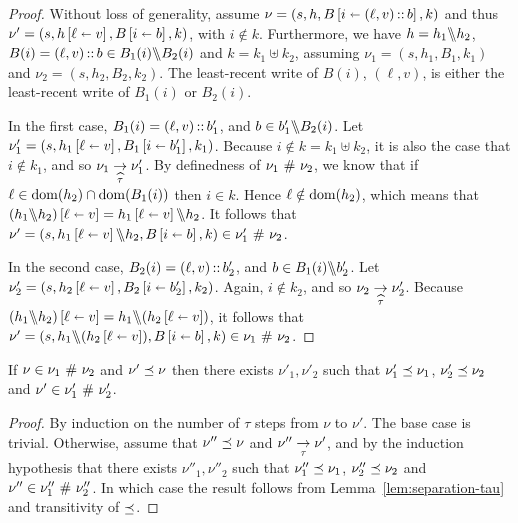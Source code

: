 \documentclass[11pt]{report}
\begin{document}
\begin{proof}
  Without loss of generality, assume $\nu = (s,h,B \left[ i \shortleftarrow (\ell,v)\operatorname{:\!:} b \right],k)$ and thus $\nu' = (s,h \left[ \ell \shortleftarrow v \right],B \left[ i \shortleftarrow b \right],k)$, with $i \notin k$. Furthermore, we have $h = h_1 \backslash\!\!\backslash h_2$, $B(i) = (\ell,v) \operatorname{:\!:} b \in B_1(i) \backslash\!\!\backslash B_2(i)$ and $k = k_1 \uplus k_2$, assuming $\nu_1 = (s,h_1,B_1,k_1)$ and $\nu_2 = (s,h_2,B_2,k_2)$. The least-recent write of $B(i)$, $(\ell,v)$, is either the least-recent write of $B_1(i)$ or $B_2(i)$. 

  In the first case, $B_1(i) = (\ell,v) \operatorname{:\!:} b_1'$, and $b \in b'_1 \backslash\!\!\backslash B_2(i)$. Let $\nu'_1 = (s,h_1 \left[ \ell \shortleftarrow v \right],B_1 \left[ i \shortleftarrow b'_1 \right],k_1)$. Because $i \notin k = k_1 \uplus k_2$, it is also the case that $i \notin k_1$, and so $\nu_1 \underset{\widehat{\tau}}{\rightarrow} \nu'_1$. By definedness of $\nu_1 \operatorname{\,\#\,} \nu_2$, we know that if $\ell \in \operatorname{\mathrm{dom}}(h_2) \cap \operatorname{\mathrm{dom}}(B_1(i))$ then $i \in k$. Hence $\ell \notin \operatorname{\mathrm{dom}}(h_2)$, which means that $(h_1 \backslash\!\!\backslash h_2) \left[ \ell \shortleftarrow v \right] = h_1 \left[ \ell \shortleftarrow v \right] \backslash\!\!\backslash h_2$. It follows that $\nu' = (s,h_1 \left[ \ell \shortleftarrow v \right] \backslash\!\!\backslash h_2, B \left[ i \shortleftarrow b \right],k) \in \nu'_1 \operatorname{\,\#\,} \nu_2$. 

  In the second case, $B_2(i) = (\ell,v) \operatorname{:\!:} b'_2$, and $b \in B_1(i) \backslash\!\!\backslash b'_2$. Let $\nu'_2 = (s,h_2 \left[ \ell \shortleftarrow v \right],B_2 \left[ i \shortleftarrow b'_2 \right],k_2)$. Again, $i \notin k_2$, and so $\nu_2 \underset{\widehat{\tau}}{\rightarrow} \nu'_2$. Because $(h_1 \backslash\!\!\backslash h_2) \left[ \ell \shortleftarrow v \right] = h_1 \backslash\!\!\backslash (h_2 \left[ \ell \shortleftarrow v \right])$, it follows that $\nu' = (s,h_1 \backslash\!\!\backslash (h_2 \left[ \ell \shortleftarrow v \right]),B \left[ i \shortleftarrow b \right],k) \in \nu_1 \operatorname{\,\#\,} \nu_2$. 
\end{proof}

\begin{lemma}
  \label{lem:separation-refinement}
  If $\nu \in \nu_1 \operatorname{\,\#\,} \nu_2$ and $\nu' \preceq \nu$ then there exists $\nu'_1,\nu'_2$ such that $\nu'_1 \preceq \nu_1$, $\nu'_2 \preceq \nu_2$ and $\nu' \in \nu'_1 \operatorname{\,\#\,} \nu'_2$. 
\end{lemma}

\begin{proof}
  By induction on the number of $\tau$ steps from $\nu$ to $\nu'$. The base case is trivial. Otherwise, assume that $\nu'' \preceq \nu$ and $\nu'' \underset{\tau}{\rightarrow} \nu'$, and by the induction hypothesis that there exists $\nu''_1,\nu''_2$ such that $\nu''_1 \preceq \nu_1$, $\nu''_2 \preceq \nu_2$ and $\nu'' \in \nu''_1 \operatorname{\,\#\,} \nu''_2$. In which case the result follows from Lemma~\ref{lem:separation-tau} and transitivity of $\preceq$.
\end{proof}
\end{document}
